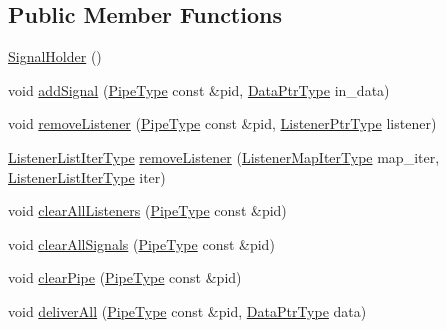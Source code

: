 \subsection*{Public Member Functions}
\begin{DoxyCompactItemize}
\item 
\hyperlink{structvt_1_1pipe_1_1signal_1_1_signal_holder_a9b8fde895ed00689216a5e4a7540cefa}{Signal\+Holder} ()
\item 
void \hyperlink{structvt_1_1pipe_1_1signal_1_1_signal_holder_ae32b546852bc4518b6d75f2e43a5eb5f}{add\+Signal} (\hyperlink{namespacevt_ac9852acda74d1896f48f406cd72c7bd3}{Pipe\+Type} const \&pid, \hyperlink{structvt_1_1pipe_1_1signal_1_1_signal_holder_aad5bfc2b46dfa071ae638385324d7e31}{Data\+Ptr\+Type} in\+\_\+data)
\item 
void \hyperlink{structvt_1_1pipe_1_1signal_1_1_signal_holder_a5be1905ef30b9c0e8764daa5f471d445}{remove\+Listener} (\hyperlink{namespacevt_ac9852acda74d1896f48f406cd72c7bd3}{Pipe\+Type} const \&pid, \hyperlink{structvt_1_1pipe_1_1signal_1_1_signal_holder_a68114d1ad5804c71e014736b18e41e08}{Listener\+Ptr\+Type} listener)
\item 
\hyperlink{structvt_1_1pipe_1_1signal_1_1_signal_holder_af0d3ccf4a8700979f414a0485cf41df5}{Listener\+List\+Iter\+Type} \hyperlink{structvt_1_1pipe_1_1signal_1_1_signal_holder_a08a8e0ba7a1eac7df48561112f5859ab}{remove\+Listener} (\hyperlink{structvt_1_1pipe_1_1signal_1_1_signal_holder_a7f6eed09a10f9b4f679c99ae85983879}{Listener\+Map\+Iter\+Type} map\+\_\+iter, \hyperlink{structvt_1_1pipe_1_1signal_1_1_signal_holder_af0d3ccf4a8700979f414a0485cf41df5}{Listener\+List\+Iter\+Type} iter)
\item 
void \hyperlink{structvt_1_1pipe_1_1signal_1_1_signal_holder_a5ef82532eb8d0d65fe7b07f7fb53491d}{clear\+All\+Listeners} (\hyperlink{namespacevt_ac9852acda74d1896f48f406cd72c7bd3}{Pipe\+Type} const \&pid)
\item 
void \hyperlink{structvt_1_1pipe_1_1signal_1_1_signal_holder_a9907ff2a131c6aafe6771c09b6ae9415}{clear\+All\+Signals} (\hyperlink{namespacevt_ac9852acda74d1896f48f406cd72c7bd3}{Pipe\+Type} const \&pid)
\item 
void \hyperlink{structvt_1_1pipe_1_1signal_1_1_signal_holder_a9f31fab057a4e9af38547859572b6127}{clear\+Pipe} (\hyperlink{namespacevt_ac9852acda74d1896f48f406cd72c7bd3}{Pipe\+Type} const \&pid)
\item 
void \hyperlink{structvt_1_1pipe_1_1signal_1_1_signal_holder_a3e04f57a784e41c422357dfda7871304}{deliver\+All} (\hyperlink{namespacevt_ac9852acda74d1896f48f406cd72c7bd3}{Pipe\+Type} const \&pid, \hyperlink{structvt_1_1pipe_1_1signal_1_1_signal_holder_aad5bfc2b46dfa071ae638385324d7e31}{Data\+Ptr\+Type} data)

\end{DoxyCompactItemize}

